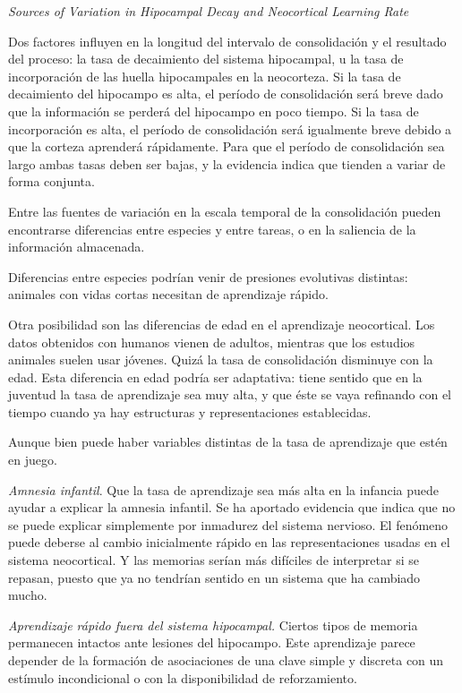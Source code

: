 \documentclass[a4paper,12pt]{article}
\begin{document}
{\itshape Sources of Variation in Hipocampal Decay and Neocortical Learning Rate}

Dos factores influyen en la longitud del intervalo de consolidación y el resultado del proceso: la tasa de decaimiento del sistema hipocampal, u la tasa de incorporación de las huella hipocampales en la neocorteza. Si la tasa de decaimiento del hipocampo es alta, el período de consolidación será breve dado que la información se perderá del hipocampo en poco tiempo. Si la tasa de incorporación es alta, el período de consolidación será igualmente breve debido a que la corteza aprenderá rápidamente. Para que el período de consolidación sea largo ambas tasas deben ser bajas, y la evidencia indica que tienden a variar de forma conjunta.

Entre las fuentes de variación en la escala temporal de la consolidación pueden encontrarse diferencias entre especies y entre tareas, o en la saliencia de la información almacenada.

Diferencias entre especies podrían venir de presiones evolutivas distintas: animales con vidas cortas necesitan de aprendizaje rápido.

Otra posibilidad son las diferencias de edad en el aprendizaje neocortical. Los datos obtenidos con humanos vienen de adultos, mientras que los estudios animales suelen usar jóvenes. Quizá la tasa de consolidación disminuye con la edad. Esta diferencia en edad podría ser adaptativa: tiene sentido que en la juventud la tasa de aprendizaje sea muy alta, y que éste se vaya refinando con el tiempo cuando ya hay estructuras y representaciones establecidas.

Aunque bien puede haber variables distintas de la tasa de aprendizaje que estén en juego.

{\itshape Amnesia infantil}. Que la tasa de aprendizaje sea más alta en la infancia puede ayudar a explicar la amnesia infantil. Se ha aportado evidencia que indica que no se puede explicar simplemente por inmadurez del sistema nervioso. El fenómeno puede deberse al cambio inicialmente rápido en las representaciones usadas en el sistema neocortical. Y las memorias serían más difíciles de interpretar si se repasan, puesto que ya no tendrían sentido en un sistema que ha cambiado mucho.

{\itshape Aprendizaje rápido fuera del sistema hipocampal.} Ciertos tipos de memoria permanecen intactos ante lesiones del hipocampo. Este aprendizaje parece depender de la formación de asociaciones de una clave simple y discreta con un estímulo incondicional o con la disponibilidad de reforzamiento. 
\end{document}

